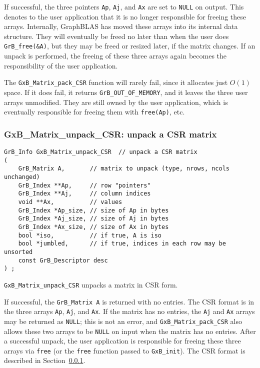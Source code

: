 \documentclass[12pt]{article}
\begin{document}
{If successful, the three pointers \verb'Ap', \verb'Aj',
and \verb'Ax' are set to \verb'NULL' on output.  This denotes to the user
application that it is no longer responsible for freeing these arrays.
Internally, GraphBLAS has moved these arrays into its internal data structure.
They will eventually be freed no later than when the user does
\verb'GrB_free(&A)', but they may be freed or resized later, if the matrix
changes.  If an unpack is performed, the freeing of these three arrays again
becomes the responsibility of the user application.

The \verb'GxB_Matrix_pack_CSR' function will rarely fail, since it allocates
just $O(1)$ space.  If it does fail, it returns \verb'GrB_OUT_OF_MEMORY',
and it leaves the three user arrays unmodified.  They are still owned by
the user application, which is eventually responsible for freeing them with
\verb'free(Ap)', etc.

\newpage
\subsubsection{{\sf GxB\_Matrix\_unpack\_CSR:} unpack a CSR matrix}
\label{matrix_unpack_csr}

\begin{mdframed}[userdefinedwidth=6in]
{\footnotesize
\begin{verbatim}
GrB_Info GxB_Matrix_unpack_CSR  // unpack a CSR matrix
(
    GrB_Matrix A,       // matrix to unpack (type, nrows, ncols unchanged)
    GrB_Index **Ap,     // row "pointers"
    GrB_Index **Aj,     // column indices
    void **Ax,          // values
    GrB_Index *Ap_size, // size of Ap in bytes
    GrB_Index *Aj_size, // size of Aj in bytes
    GrB_Index *Ax_size, // size of Ax in bytes
    bool *iso,          // if true, A is iso
    bool *jumbled,      // if true, indices in each row may be unsorted
    const GrB_Descriptor desc
) ;
\end{verbatim}
} \end{mdframed}

\verb'GxB_Matrix_unpack_CSR' unpacks a matrix in CSR form.

If successful, the \verb'GrB_Matrix A' is returned with no entries.
The CSR format is in the three arrays
\verb'Ap', \verb'Aj', and \verb'Ax'.  If the matrix has no entries, the
\verb'Aj' and \verb'Ax' arrays may be returned as \verb'NULL'; this is not an
error, and \verb'GxB_Matrix_pack_CSR' also allows these two arrays to be
\verb'NULL' on input when the matrix has no entries.  After a successful
unpack, the user application is responsible for freeing these three arrays via
\verb'free' (or the \verb'free' function passed to \verb'GxB_init').  The CSR
format is described in Section~\ref{matrix_unpack_csr}.

}
\end{document}
